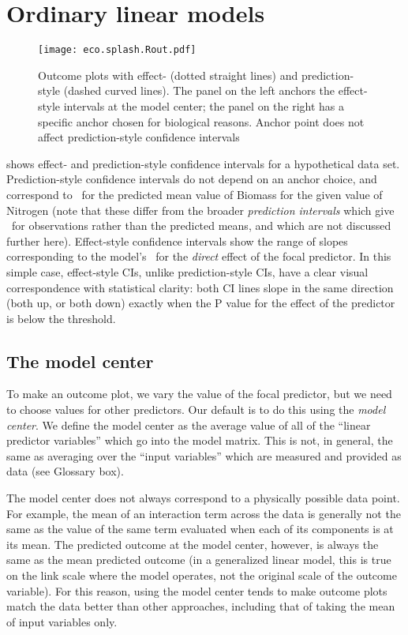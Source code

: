 
\section{Ordinary linear models}

\begin{figure}
\begin{center}
\texttt{[image: eco.splash.Rout.pdf]}
\end{center}
\caption{Outcome plots with effect- (dotted straight lines) and prediction-style (dashed curved lines). The panel on the left anchors the effect-style intervals at the model center; the panel on the right has a specific anchor chosen for biological reasons. Anchor point does not affect prediction-style confidence intervals}
\end{figure}

 shows effect- and prediction-style confidence intervals for a hypothetical data set. Prediction-style confidence intervals do not depend on an anchor choice, and correspond to \CIs\ for the predicted mean value of Biomass for the given value of Nitrogen (note that these differ from the broader \emph{prediction intervals} which give \CIs\ for observations rather than the predicted means, and which are not discussed further here). Effect-style confidence intervals show the range of slopes corresponding to the model's \CIs\ for the \emph{direct} effect of the focal predictor. In this simple case, effect-style CIs, unlike prediction-style CIs, have a clear visual correspondence with statistical clarity: both CI lines slope in the same direction (both up, or both down) exactly when the P value for the effect of the predictor is below the threshold.

\subsection{The model center}

To make an outcome plot, we vary the value of the focal predictor, but we need to choose values for other predictors. Our default is to do this using the \emph{model center}. We define the model center as the average value of all of the “linear predictor variables” which go into the model matrix. This is not, in general, the same as averaging over the “input variables” which are measured and provided as data (see Glossary box). 

The model center does not always correspond to a physically possible data point. For example, the mean of an interaction term across the data is generally not the same as the value of the same term evaluated when each of its components is at its mean. The predicted outcome at the model center, however, is always the same as the mean predicted outcome (in a generalized linear model, this is true on the link scale where the model operates, not the original scale of the outcome variable). For this reason, using the model center tends to make outcome plots match the data better than other approaches, including that of taking the mean of input variables only.

